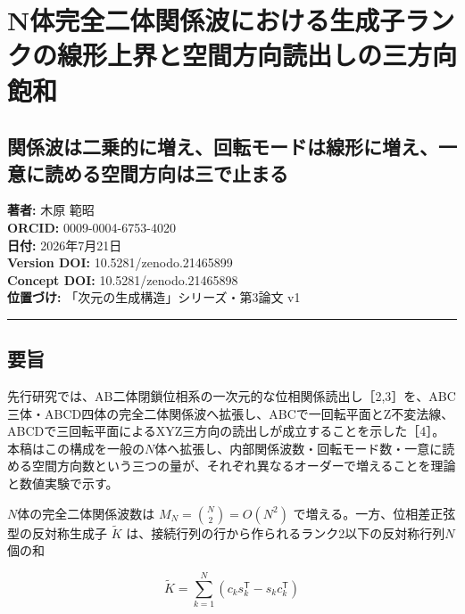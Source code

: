 \documentclass[
  a4paper,
]{ltjsarticle}
\author{}
\date{}
\begin{document}
\section{N体完全二体関係波における生成子ランクの線形上界と空間方向読出しの三方向飽和}\label{nux4f53ux5b8cux5168ux4e8cux4f53ux95a2ux4fc2ux6ce2ux306bux304aux3051ux308bux751fux6210ux5b50ux30e9ux30f3ux30afux306eux7ddaux5f62ux4e0aux754cux3068ux7a7aux9593ux65b9ux5411ux8aadux51faux3057ux306eux4e09ux65b9ux5411ux98fdux548c}

\subsection{関係波は二乗的に増え、回転モードは線形に増え、一意に読める空間方向は三で止まる}\label{ux95a2ux4fc2ux6ce2ux306fux4e8cux4e57ux7684ux306bux5897ux3048ux56deux8ee2ux30e2ux30fcux30c9ux306fux7ddaux5f62ux306bux5897ux3048ux4e00ux610fux306bux8aadux3081ux308bux7a7aux9593ux65b9ux5411ux306fux4e09ux3067ux6b62ux307eux308b}

\textbf{著者:} 木原 範昭\\
\textbf{ORCID:} 0009-0004-6753-4020\\
\textbf{日付:} 2026年7月21日\\
\textbf{Version DOI:} 10.5281/zenodo.21465899\\
\textbf{Concept DOI:} 10.5281/zenodo.21465898\\
\textbf{位置づけ:} 「次元の生成構造」シリーズ・第3論文 v1

\begin{center}\rule{0.5\linewidth}{0.5pt}\end{center}

\subsection{要旨}\label{ux8981ux65e8}

先行研究では、AB二体閉鎖位相系の一次元的な位相関係読出し［2,3］を、ABC三体・ABCD四体の完全二体関係波へ拡張し、ABCで一回転平面とZ不変法線、ABCDで三回転平面によるXYZ三方向の読出しが成立することを示した［4］。本稿はこの構成を一般の\(N\)体へ拡張し、内部関係波数・回転モード数・一意に読める空間方向数という三つの量が、それぞれ異なるオーダーで増えることを理論と数値実験で示す。

\(N\)体の完全二体関係波数は \(M_N=\binom{N}{2}=O(N^2)\)
で増える。一方、位相差正弦型の反対称生成子 \(\widetilde K\)
は、接続行列の行から作られるランク2以下の反対称行列\(N\)個の和

\[
\widetilde K=\sum_{k=1}^{N}\left(c_k s_k^{\mathsf T}-s_k c_k^{\mathsf T}\right)
\]
\end{document}
